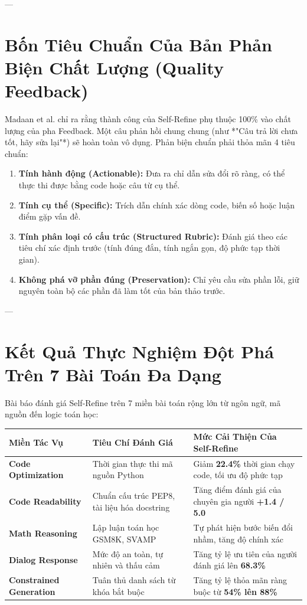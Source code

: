 \documentclass[11pt,a4paper]{article}
\begin{document}
---

\section{Bốn Tiêu Chuẩn Của Bản Phản Biện Chất Lượng (Quality Feedback)}

Madaan et al. chỉ ra rằng thành công của Self-Refine phụ thuộc 100\% vào chất lượng của pha Feedback. Một câu phản hồi chung chung (như *"Câu trả lời chưa tốt, hãy sửa lại"*) sẽ hoàn toàn vô dụng. Phản biện chuẩn phải thỏa mãn 4 tiêu chuẩn:
\begin{enumerate}[leftmargin=1.8em]
    \item \textbf{Tính hành động (Actionable):} Đưa ra chỉ dẫn sửa đổi rõ ràng, có thể thực thi được bằng code hoặc câu từ cụ thể.
    \item \textbf{Tính cụ thể (Specific):} Trích dẫn chính xác dòng code, biến số hoặc luận điểm gặp vấn đề.
    \item \textbf{Tính phân loại có cấu trúc (Structured Rubric):} Đánh giá theo các tiêu chí xác định trước (tính đúng đắn, tính ngắn gọn, độ phức tạp thời gian).
    \item \textbf{Không phá vỡ phần đúng (Preservation):} Chỉ yêu cầu sửa phần lỗi, giữ nguyên toàn bộ các phần đã làm tốt của bản thảo trước.
\end{enumerate}

---

\section{Kết Quả Thực Nghiệm Đột Phá Trên 7 Bài Toán Đa Dạng}

Bài báo đánh giá Self-Refine trên 7 miền bài toán rộng lớn từ ngôn ngữ, mã nguồn đến logic toán học:
\begin{table}[H]
\centering
\small
\begin{tabularx}{\textwidth}{lXX}
\toprule
\textbf{Miền Tác Vụ} & \textbf{Tiêu Chí Đánh Giá} & \textbf{Mức Cải Thiện Của Self-Refine} \\
\midrule
\textbf{Code Optimization} & Thời gian thực thi mã nguồn Python & Giảm \textbf{22.4\%} thời gian chạy code, tối ưu độ phức tạp \\
\textbf{Code Readability} & Chuẩn cấu trúc PEP8, tài liệu hóa docstring & Tăng điểm đánh giá của chuyên gia người \textbf{+1.4 / 5.0} \\
\textbf{Math Reasoning} & Lập luận toán học GSM8K, SVAMP & Tự phát hiện bước biến đổi nhầm, tăng độ chính xác \\
\textbf{Dialog Response} & Mức độ an toàn, tự nhiên và thấu cảm & Tăng tỷ lệ ưu tiên của người đánh giá lên \textbf{68.3\%} \\
\textbf{Constrained Generation} & Tuân thủ danh sách từ khóa bắt buộc & Tăng tỷ lệ thỏa mãn ràng buộc từ \textbf{54\% lên 88\%} \\
\bottomrule
\end{tabularx}
\end{table}
\end{document}
